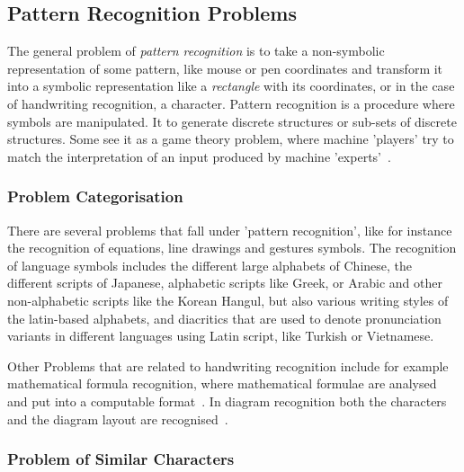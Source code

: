 \subsection{Pattern Recognition Problems}
\label{sec:patternrecognitionproblems}


The general problem of \emph{pattern recognition} is to take a non-symbolic 
representation of some pattern, like mouse or pen coordinates and transform
it into a symbolic representation like a \emph{rectangle} with its coordinates,
or in the case of handwriting recognition, a character. Pattern recognition is 
a procedure where symbols are manipulated. It to generate discrete structures or 
sub-sets of discrete structures. Some see it as a game theory problem, 
where machine 'players' try to match the interpretation of an input produced 
by machine 'experts'~.

\subsubsection{Problem Categorisation}
\label{sec:relatedproblems}

There are several problems that fall under 'pattern recognition', 
like for instance the recognition of equations, line drawings and 
gestures symbols. The recognition of language symbols includes 
the different large alphabets of Chinese, the different scripts of Japanese, 
alphabetic scripts like Greek, or Arabic and other non-alphabetic scripts like
the Korean  Hangul, but also various writing styles of the latin-based 
alphabets, and diacritics that are used to denote pronunciation variants in 
different languages using Latin script, like Turkish or Vietnamese.

Other Problems that are related to handwriting recognition include for example
mathematical formula recognition, where mathematical formulae are analysed and 
put into a computable format~. In diagram recognition 
both the characters and the diagram layout are 
recognised~.

\subsubsection{Problem of Similar Characters}
\label{sec:similarcharacters}

